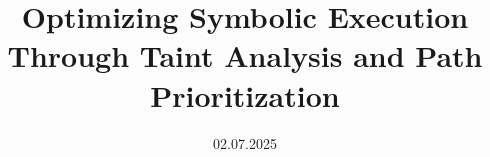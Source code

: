 \documentclass[a4paper, 10pt, oneside]{memoir}
\title				{Optimizing Symbolic Execution Through Taint Analysis and Path Prioritization}
\date				{02.07.2025}
\begin{document}

\thesisfront
\maketitle
\pagestyle{thesis}


\thesistoc
\thesismain









\thesisappendix
\thesisbib
\begin{appendices}
	 
\end{appendices}
\thesisback
{}
  {}
  {}
\end{document}
